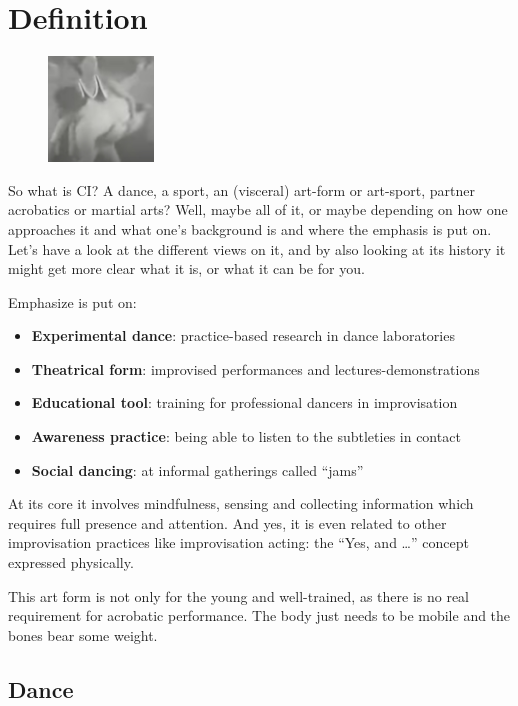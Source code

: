 \section{Definition}\label{sec:definition}

\begin{figure}
\centering
\includegraphics[width=0.25\textwidth]{images/definition}
\end{figure}

So what is CI? A dance, a sport, an (visceral) art-form or art-sport, partner acrobatics or martial arts?
Well, maybe all of it, or maybe depending on how one approaches it and what one's background is and where the emphasis is put on.
Let's have a look at the different views on it, and by also looking at its history it might get more clear what it is, or what it can be for you.

Emphasize is put on:
\begin{itemize}
	\item \textbf{Experimental dance}: practice-based research in dance laboratories
	\item \textbf{Theatrical form}: improvised performances and lectures-demonstrations
	\item \textbf{Educational tool}: training for professional dancers in improvisation
	\item \textbf{Awareness practice}: being able to listen to the subtleties in contact
	\item \textbf{Social dancing}: at informal gatherings called ``jams''
\end{itemize}

At its core it involves mindfulness, sensing and collecting information which requires full presence and attention.
And yes, it is even related to other improvisation practices like improvisation acting: the ``Yes, and \ldots'' concept expressed physically.

This art form is not only for the young and well-trained, as there is no real requirement for acrobatic performance.
The body just needs to be mobile and the bones bear some weight.

\subsection{Dance}\label{subsec:dance}

